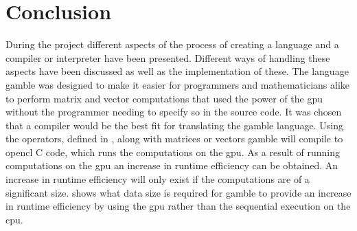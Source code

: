 \chapter{Conclusion} %
\label{cha:conclusion}
During the project different aspects of the process of creating a language and a compiler or interpreter have been presented.
Different ways of handling these aspects have been discussed as well as the implementation of these.
The language \gls{gamble} was designed to make it easier for programmers and mathematicians alike to perform matrix and vector computations that used the power of the \acrshort{gpu} without the programmer needing to specify so in the source code.
It was chosen that a compiler would be the best fit for translating the \gls{gamble} language.
Using the operators, defined in , along with matrices or vectors \gls{gamble} will compile to \gls{opencl} C code, which runs the computations on the \acrshort{gpu}.
As a result of running computations on the \acrshort{gpu} an increase in runtime efficiency can be obtained.
An increase in runtime efficiency will only exist if the computations are of a significant size.  shows what data size is required for \gls{gamble} to provide an increase in runtime efficiency by using the \acrshort{gpu} rather than the sequential execution on the \acrshort{cpu}.

